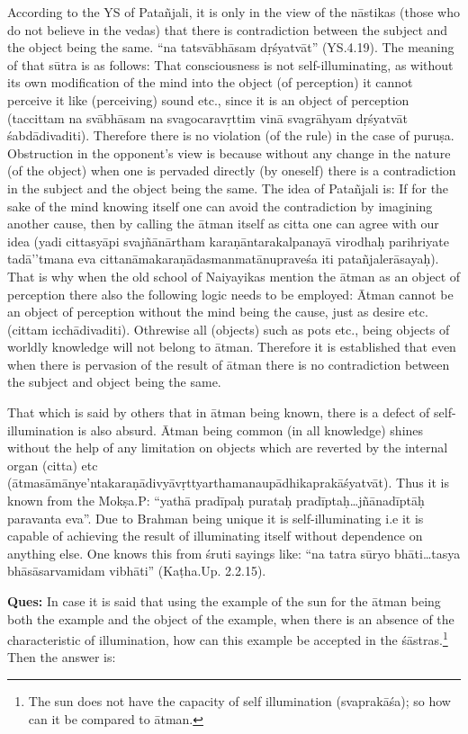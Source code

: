 According to the YS of Patañjali, it is only in the view of the nāstikas (those who do not believe in the vedas) that there is contradiction between the subject and the object being the same.  “na tatsvābhāsam dṛśyatvāt” (YS.4.19). The meaning of that sūtra is as follows: That consciousness is not self-illuminating, as without its own modification of the mind into the object (of perception) it cannot perceive it like (perceiving) sound etc., since it is an object of perception (taccittam na svābhāsam na svagocaravṛttim vinā svagrāhyam dṛśyatvāt śabdādivaditi). Therefore there is no violation (of the rule) in the case of puruṣa.   Obstruction in the opponent’s view is because without any change in the nature (of the object) when one is pervaded directly (by oneself) there is a contradiction in the subject and the object being the same. The idea of Patañjali is:  If for the sake of the mind knowing itself one can avoid the contradiction by imagining another cause, then by calling the ātman itself as citta one can agree with our idea (yadi cittasyāpi svajñānārtham karaṇāntarakalpanayā virodhaḥ parihriyate tadā’’tmana eva cittanāmakaraṇādasmanmatānupraveśa iti patañjalerāsayaḥ). That is why when the old school of Naiyayikas mention the ātman as an object of perception there also the following logic needs to be employed: Ātman cannot be an object of perception without the mind being the cause, just as desire etc. (cittam icchādivaditi).  Othrewise all (objects) such as pots etc., being objects of worldly knowledge will not belong to ātman. Therefore it is established that even when there is pervasion of the result of ātman there is no contradiction between the subject and object being the same.

That which is said by others that in ātman being known, there is a defect of self-illumination is also absurd. Ātman being common (in all knowledge) shines without the help of any limitation on objects which are reverted by the internal organ (citta) etc (ātmasāmānye’ntakaraṇā\-divyāvṛttyarthamanaupādhikaprakāśyatvāt). Thus it is known from the Mokṣa.P: “yathā pradīpaḥ purataḥ pradīptaḥ…jñānadīptāḥ paravanta eva”. Due to Brahman being unique it is self-illuminating i.e it is capable of achieving the result of illuminating itself without dependence on anything else. One knows this from śruti sayings like: “na tatra sūryo bhāti…tasya bhāsāsarvamidam vibhāti” (Kaṭha.Up. 2.2.15). 

\textbf{Ques:} In case it is said that using the example of the sun for the ātman being both the   example and the object of the  example, when there is an absence of the characteristic of illumination, how can this example be accepted in the śāstras.\footnote{The sun does not have the capacity of self illumination (svaprakāśa); so how can it be compared to ātman.} Then the answer is: 

